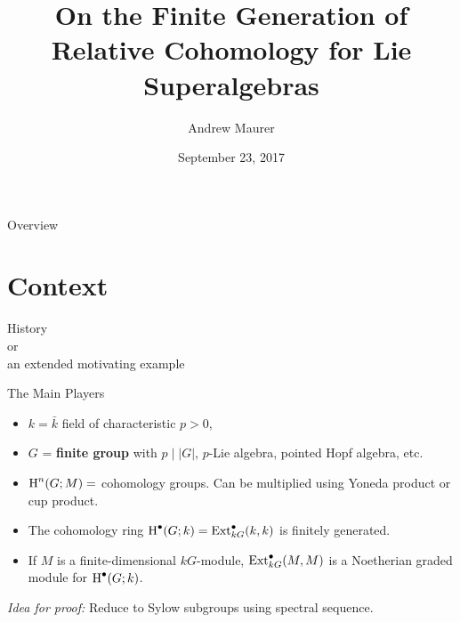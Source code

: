 \documentclass[handout]{beamer}
\begin{document}
\author[A. Maurer]{Andrew Maurer}
\date{September 23, 2017}
\title[On the FG of $\H^\bullet$ for LSA]{On the Finite Generation of Relative Cohomology for Lie Superalgebras}

\begin{frame}
  \maketitle
\end{frame}

\begin{frame}{Overview}
  \tableofcontents
\end{frame}

\section[Context]{Context}

\begin{frame}
  \begin{center}
    \huge History
    \\ \footnotesize or
    \\ \small an extended motivating example
  \end{center}
\end{frame}

\begin{frame}{The Main Players}
  \begin{itemize}
    \item $k = \bar k$ field of characteristic $p > 0$,
    \item $G$ = \textbf{finite group} with $p \mid |G|$, $p$-Lie algebra, pointed Hopf algebra, etc.
    \item $\operatorname{H}^n(G;M) =$ cohomology groups. Can be multiplied using Yoneda product or cup product.
    \end{itemize}
    \begin{theorem}[Evens, `61]
      \begin{itemize}
      \item The cohomology ring $\operatorname{H}^\bullet(G;k) = \operatorname{Ext}_{kG}^\bullet(k,k)$ is finitely generated.
      \item If $M$ is a finite-dimensional $kG$-module, $\operatorname{Ext}_{kG}^\bullet(M,M)$ is a Noetherian graded module for $\operatorname{H}^\bullet(G;k)$.
      \end{itemize}
    \end{theorem}
    \emph{Idea for proof:} Reduce to Sylow subgroups using spectral sequence.
  \end{frame}
\end{document}
